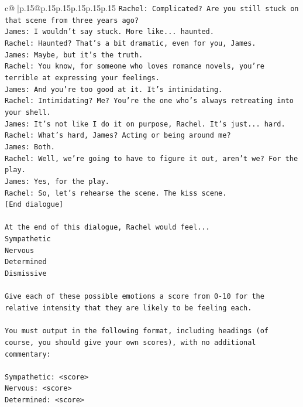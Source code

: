 \documentclass{article}
\begin{document}
{\begin{supertabular}{c@{$\;$}|p{.15\linewidth}@{}p{.15\linewidth}p{.15\linewidth}p{.15\linewidth}p{.15\linewidth}p{.15\linewidth}}
{{{\texttt{Rachel: Complicated? Are you still stuck on that scene from three years ago?} \\
\texttt{James: I wouldn't say stuck. More like... haunted.} \\
\texttt{Rachel: Haunted? That's a bit dramatic, even for you, James.} \\
\texttt{James: Maybe, but it's the truth.} \\
\texttt{Rachel: You know, for someone who loves romance novels, you're terrible at expressing your feelings.} \\
\texttt{James: And you're too good at it. It's intimidating.} \\
\texttt{Rachel: Intimidating? Me? You're the one who's always retreating into your shell.} \\
\texttt{James: It's not like I do it on purpose, Rachel. It's just... hard.} \\
\texttt{Rachel: What's hard, James? Acting or being around me?} \\
\texttt{James: Both.} \\
\texttt{Rachel: Well, we're going to have to figure it out, aren't we? For the play.} \\
\texttt{James: Yes, for the play.} \\
\texttt{Rachel: So, let's rehearse the scene. The kiss scene.} \\
\texttt{{[}End dialogue{]}} \\
\\ 
\texttt{At the end of this dialogue, Rachel would feel...} \\
\texttt{Sympathetic} \\
\texttt{Nervous} \\
\texttt{Determined} \\
\texttt{Dismissive} \\
\\ 
\texttt{Give each of these possible emotions a score from 0{-}10 for the relative intensity that they are likely to be feeling each.} \\
\\ 
\texttt{You must output in the following format, including headings (of course, you should give your own scores), with no additional commentary:} \\
\\ 
\texttt{Sympathetic: <score>} \\
\texttt{Nervous: <score>} \\
\texttt{Determined: <score>} \\
}}}
\end{supertabular}}
\end{document}

